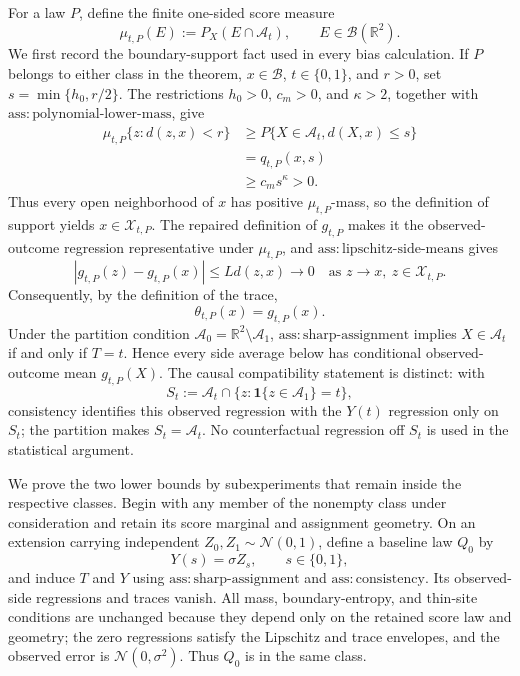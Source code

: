 For a law \(P\), define the finite one-sided score measure
\[
 \mu_{t,P}(E):=P_X(E\cap\mathcal A_t),\qquad E\in\mathcal B(\mathbb R^2).
\]
We first record the boundary-support fact used in every bias calculation.  If \(P\) belongs to either class in the theorem, \(x\in\mathcal B\), \(t\in\{0,1\}\), and \(r>0\), set \(s=\min\{h_0,r/2\}\).  The restrictions \(h_0>0\), \(c_m>0\), and \(\kappa>2\), together with \(\mathrm{ass:polynomial\text{-}lower\text{-}mass}\), give
\[
 \begin{aligned}
 \mu_{t,P}\{z:d(z,x)<r\}
 &\ge P\{X\in\mathcal A_t,d(X,x)\le s\}\\
 &=q_{t,P}(x,s)\\
 &\ge c_m s^\kappa>0.
 \end{aligned}
\]
Thus every open neighborhood of \(x\) has positive \(\mu_{t,P}\)-mass, so the definition of support yields \(x\in\mathcal X_{t,P}\).  The repaired definition of \(g_{t,P}\) makes it the observed-outcome regression representative under \(\mu_{t,P}\), and \(\mathrm{ass:lipschitz\text{-}side\text{-}means}\) gives
\[
 |g_{t,P}(z)-g_{t,P}(x)|\le Ld(z,x)\longrightarrow0
 \quad\text{as }z\to x,\ z\in\mathcal X_{t,P}.
\]
Consequently, by the definition of the trace,
\[
 \theta_{t,P}(x)=g_{t,P}(x). \tag{1}
\]
Under the partition condition \(\mathcal A_0=\mathbb R^2\setminus\mathcal A_1\), \(\mathrm{ass:sharp\text{-}assignment}\) implies \(X\in\mathcal A_t\) if and only if \(T=t\).  Hence every side average below has conditional observed-outcome mean \(g_{t,P}(X)\).  The causal compatibility statement is distinct: with
\[
 S_t:=\mathcal A_t\cap\{z:\mathbf 1\{z\in\mathcal A_1\}=t\},
\]
consistency identifies this observed regression with the \(Y(t)\) regression only on \(S_t\); the partition makes \(S_t=\mathcal A_t\).  No counterfactual regression off \(S_t\) is used in the statistical argument.

We prove the two lower bounds by subexperiments that remain inside the respective classes.  Begin with any member of the nonempty class under consideration and retain its score marginal and assignment geometry.  On an extension carrying independent \(Z_0,Z_1\sim\mathcal N(0,1)\), define a baseline law \(Q_0\) by
\[
 Y(s)=\sigma Z_s,\qquad s\in\{0,1\},
\]
and induce \(T\) and \(Y\) using \(\mathrm{ass:sharp\text{-}assignment}\) and \(\mathrm{ass:consistency}\).  Its observed-side regressions and traces vanish.  All mass, boundary-entropy, and thin-site conditions are unchanged because they depend only on the retained score law and geometry; the zero regressions satisfy the Lipschitz and trace envelopes, and the observed error is \(\mathcal N(0,\sigma^2)\).  Thus \(Q_0\) is in the same class.

